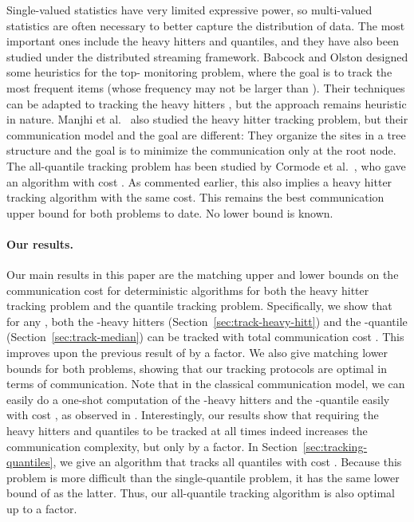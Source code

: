 \documentclass[10pt]{article}
\begin{document}
Single-valued statistics have very limited expressive power, so
multi-valued statistics are often necessary to better capture the
distribution of data.  The most important ones include the heavy hitters
and quantiles, and they have also been studied under the distributed
streaming framework.  Babcock and Olston \cite{Babcock:Olston:03} designed
some heuristics for the top- monitoring problem, where the goal is to
track the  most frequent items (whose frequency may not be larger than
).  Their techniques can be adapted to tracking the heavy hitters
\cite{fuller07:_fids}, but the approach remains heuristic in nature.
Manjhi et al.~\cite{manjhi05:_findin} also studied the heavy hitter
tracking problem, but their communication model and the goal are different:
They organize the sites in a tree structure and the goal is to minimize the
communication only at the root node.  The all-quantile tracking problem has
been studied by Cormode et
al.~\cite{Cormode:Garofalakis:Muthukrishnan:Rastogi:05}, who gave an
algorithm with cost .  As commented earlier, this
also implies a heavy hitter tracking algorithm with the same cost.  This
remains the best communication upper bound for both problems to date.  No
lower bound is known.

\paragraph{Our results.}
Our main results in this paper are the matching upper and lower bounds on
the communication cost for deterministic algorithms for both the heavy
hitter tracking problem and the quantile tracking problem.  Specifically,
we show that for any , both the -heavy hitters
(Section~\ref{sec:track-heavy-hitt}) and the -quantile
(Section~\ref{sec:track-median}) can be tracked with total communication
cost .  This improves upon the previous result of
\cite{Cormode:Garofalakis:Muthukrishnan:Rastogi:05} by a 
factor.  We also give matching lower bounds for both problems, showing that
our tracking protocols are optimal in terms of communication.  Note that in
the classical communication model, we can easily do a one-shot computation
of the -heavy hitters and the -quantile easily with cost
, as observed in
\cite{Cormode:Garofalakis:Muthukrishnan:Rastogi:05}.  Interestingly, our
results show that requiring the heavy hitters and quantiles to be tracked
at all times indeed increases the communication complexity, but only by a
 factor.  In Section~\ref{sec:tracking-quantiles}, we give
an algorithm that tracks all quantiles with cost .  Because this problem is more difficult than
the single-quantile problem, it has the same lower bound of  as the latter.  Thus, our all-quantile tracking algorithm is
also optimal up to a  factor.
\end{document}
